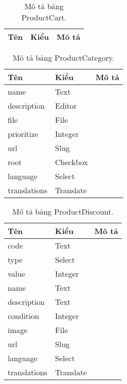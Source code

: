 \begin{table}[p]
	\begin{center}
		\begin{tabular}{ |l|l|l| } 
			\hline
			Tên & Kiểu & Mô tả \\
			\hline
			
			\hline
		\end{tabular}
		\caption{Mô tả bảng ProductCart.}
		\label{table:ProductCart}
	\end{center}
\end{table}


\begin{table}[p]
	\begin{center}
		\begin{tabular}{ |l|l|l| } 
			\hline
			Tên & Kiểu & Mô tả \\
			\hline
			name & Text & \dotfill \\
			description & Editor & \dotfill \\
			file & File & \dotfill \\
			prioritize & Integer & \dotfill \\
			url & Slug & \dotfill \\
			root & Checkbox & \dotfill \\
			language & Select & \dotfill \\
			translations & Translate & \dotfill \\ 
			\hline
		\end{tabular}
		\caption{Mô tả bảng ProductCategory.}
		\label{table:ProductCategory}
	\end{center}
\end{table}


\begin{table}[p]
	\begin{center}
		\begin{tabular}{ |l|l|l| } 
			\hline
			Tên & Kiểu & Mô tả \\
			\hline
			code & Text & \dotfill \\
			type & Select & \dotfill \\
			value & Integer & \dotfill \\
			name & Text & \dotfill \\
			description & Text & \dotfill \\
			condition & Integer & \dotfill \\
			image & File & \dotfill \\
			url & Slug & \dotfill \\
			language & Select & \dotfill \\
			translations & Translate & \dotfill \\ 
			\hline
		\end{tabular}
		\caption{Mô tả bảng ProductDiscount.}
		\label{table:ProductDiscount}
	\end{center}
\end{table}


